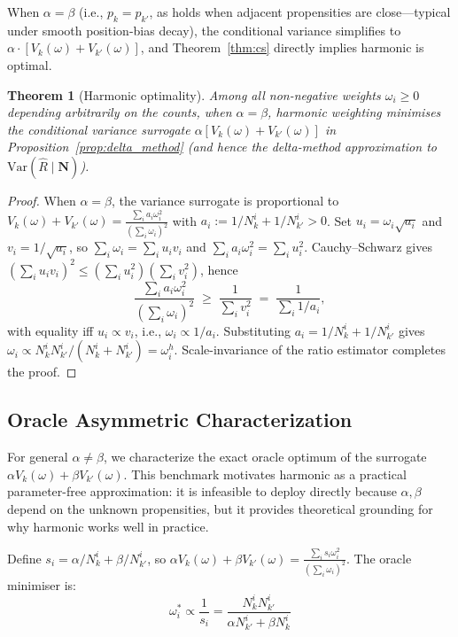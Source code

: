 \documentclass[sigconf]{acmart}
\newtheorem{theorem}{Theorem}
\begin{document}
When $\alpha = \beta$ (i.e., $p_k = p_{k'}$, as holds when adjacent propensities are close---typical under smooth position-bias decay), the conditional variance simplifies to $\alpha \cdot [V_k(\omega) + V_{k'}(\omega)]$, and Theorem~\ref{thm:cs} directly implies harmonic is optimal.

\begin{theorem}[Harmonic optimality]
\label{thm:optimality}
Among all non-negative weights $\omega_i \geq 0$ depending arbitrarily on the
counts, when $\alpha = \beta$, harmonic weighting minimises the conditional
variance surrogate $\alpha[V_k(\omega)+V_{k'}(\omega)]$ in
Proposition~\ref{prop:delta_method} (and hence the delta-method approximation
to $\mathrm{Var}(\hat{R} \mid \mathbf{N})$).
\end{theorem}

\begin{proof}
When $\alpha = \beta$, the variance surrogate is proportional to
$V_k(\omega)+V_{k'}(\omega)=\frac{\sum_i a_i\omega_i^2}{(\sum_i \omega_i)^2}$
with $a_i := 1/N_k^i+1/N_{k'}^i > 0$. Set $u_i = \omega_i\sqrt{a_i}$ and
$v_i = 1/\sqrt{a_i}$, so $\sum_i \omega_i = \sum_i u_i v_i$ and
$\sum_i a_i\omega_i^2 = \sum_i u_i^2$. Cauchy--Schwarz gives
$(\sum_i u_i v_i)^2 \leq (\sum_i u_i^2)(\sum_i v_i^2)$, hence
\[
\frac{\sum_i a_i\omega_i^2}{(\sum_i \omega_i)^2}
\;\geq\;\frac{1}{\sum_i v_i^2}\;=\;\frac{1}{\sum_i 1/a_i},
\]
with equality iff $u_i \propto v_i$, i.e., $\omega_i \propto 1/a_i$.
Substituting $a_i = 1/N_k^i+1/N_{k'}^i$ gives
$\omega_i \propto N_k^i N_{k'}^i/(N_k^i+N_{k'}^i) = \omega_i^h$.
Scale-invariance of the ratio estimator completes the proof.
\end{proof}

\subsection{Oracle Asymmetric Characterization}
\label{sec:asymmetric_optimum}

For general $\alpha \neq \beta$, we characterize the exact oracle optimum of the surrogate $\alpha V_k(\omega)+\beta V_{k'}(\omega)$. This benchmark motivates harmonic as a practical parameter-free approximation: it is infeasible to deploy directly because $\alpha,\beta$ depend on the unknown propensities, but it provides theoretical grounding for why harmonic works well in practice.

Define $s_i = \alpha/N_k^i + \beta/N_{k'}^i$, so $\alpha V_k(\omega)+\beta V_{k'}(\omega) = \frac{\sum_i s_i \omega_i^2}{(\sum_i \omega_i)^2}$.
The oracle minimiser is:
\begin{equation}
\label{eq:omega_star}
\omega_i^* \propto \frac{1}{s_i} = \frac{N_k^i N_{k'}^i}{\alpha N_{k'}^i + \beta N_k^i}
\end{equation}
\end{document}
